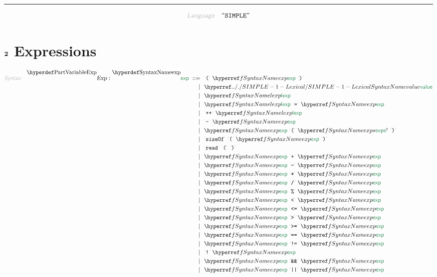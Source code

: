 

\begin{center}
\rule{3in}{0.4pt}
\end{center}

\begin{displaymath}
\KEY{Language} \quad \STRING{SIMPLE}
\end{displaymath}

\section{$\SECT{2}$ Expressions}\hypertarget{SectionNumber:2}{}\label{SectionNumber:2}

\begin{align*}
  \KEY{Syntax} \quad
    \VARDECL{Exp} : \SYNDECL{exp}
      \ ::= \ & \
      \LEX{{(}} \ \SYNREF{exp} \ \LEX{{)}} \\
      \ \mid \ & \ \SYNHYPER{../.}{SIMPLE-1-Lexical}{value} \\
      \ \mid \ & \ \SYNREF{lexp} \\
      \ \mid \ & \ \SYNREF{lexp} \ \LEX{{=}} \ \SYNREF{exp} \\
      \ \mid \ & \ \LEX{{+}{+}} \ \SYNREF{lexp} \\
      \ \mid \ & \ \LEX{{-}} \ \SYNREF{exp} \\
      \ \mid \ & \ \SYNREF{exp} \ \LEX{{(}} \ \SYNREF{exps}\QUERY \ \LEX{{)}} \\
      \ \mid \ & \ \LEX{sizeOf} \ \LEX{{(}} \ \SYNREF{exp} \ \LEX{{)}} \\
      \ \mid \ & \ \LEX{read} \ \LEX{{(}} \ \LEX{{)}} \\
      \ \mid \ & \ \SYNREF{exp} \ \LEX{{+}} \ \SYNREF{exp} \\
      \ \mid \ & \ \SYNREF{exp} \ \LEX{{-}} \ \SYNREF{exp} \\
      \ \mid \ & \ \SYNREF{exp} \ \LEX{{*}} \ \SYNREF{exp} \\
      \ \mid \ & \ \SYNREF{exp} \ \LEX{{/}} \ \SYNREF{exp} \\
      \ \mid \ & \ \SYNREF{exp} \ \LEX{{\PERCENT}} \ \SYNREF{exp} \\
      \ \mid \ & \ \SYNREF{exp} \ \LEX{{<}} \ \SYNREF{exp} \\
      \ \mid \ & \ \SYNREF{exp} \ \LEX{{<}{=}} \ \SYNREF{exp} \\
      \ \mid \ & \ \SYNREF{exp} \ \LEX{{>}} \ \SYNREF{exp} \\
      \ \mid \ & \ \SYNREF{exp} \ \LEX{{>}{=}} \ \SYNREF{exp} \\
      \ \mid \ & \ \SYNREF{exp} \ \LEX{{=}{=}} \ \SYNREF{exp} \\
      \ \mid \ & \ \SYNREF{exp} \ \LEX{{!}{=}} \ \SYNREF{exp} \\
      \ \mid \ & \ \LEX{{!}} \ \SYNREF{exp} \\
      \ \mid \ & \ \SYNREF{exp} \ \LEX{{\AMPERSAND}{\AMPERSAND}} \ \SYNREF{exp} \\
      \ \mid \ & \ \SYNREF{exp} \ \LEX{{|}{|}} \ \SYNREF{exp}
\end{align*}

